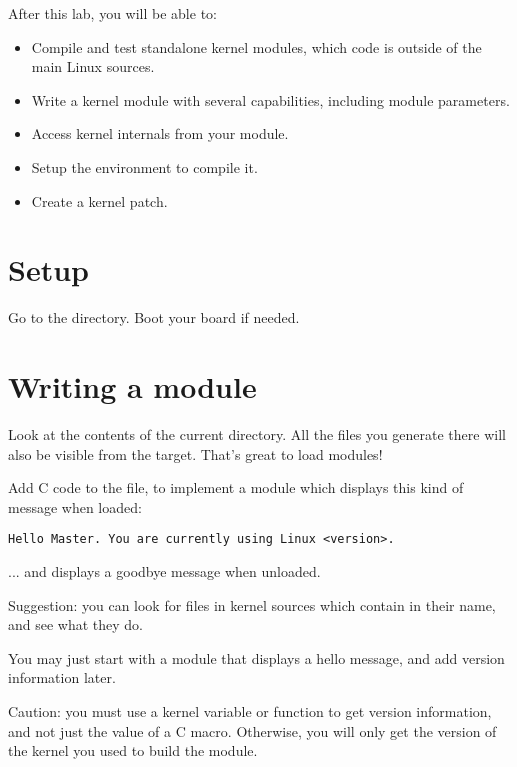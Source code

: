 
After this lab, you will be able to:

\begin{itemize}
\item Compile and test standalone kernel modules, which code is outside of the main Linux sources.
\item Write a kernel module with several capabilities, including module parameters.
\item Access kernel internals from your module.
\item Setup the environment to compile it.
\item Create a kernel patch.
\end{itemize}

\section{Setup}

Go to the  directory.
Boot your board if needed.

\section{Writing a module}

Look at the contents of the current directory. All the files you generate
there will also be visible from the target. That's great to load
modules!

Add C code to the  file, to implement a module which
displays this kind of message when loaded:

\begin{verbatim}
Hello Master. You are currently using Linux <version>.
\end{verbatim}

... and displays a goodbye message when unloaded.

Suggestion: you can look for files in kernel sources which
contain  in their name, and see what they do.

You may just start with a module that displays a hello message, and
add version information later.

Caution: you must use a kernel variable or function to get version
information, and not just the value of a C macro. Otherwise, you will
only get the version of the kernel you used to build the
module.

